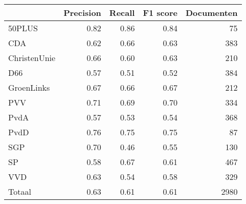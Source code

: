 \begin{tabular}{lrrrr}
\toprule
{} &  Precision &  Recall &  F1 score &  Documenten \\
\midrule
50PLUS       &       0.82 &    0.86 &      0.84 &          75 \\
CDA          &       0.62 &    0.66 &      0.63 &         383 \\
ChristenUnie &       0.66 &    0.60 &      0.63 &         210 \\
D66          &       0.57 &    0.51 &      0.52 &         384 \\
GroenLinks   &       0.67 &    0.66 &      0.67 &         212 \\
PVV          &       0.71 &    0.69 &      0.70 &         334 \\
PvdA         &       0.57 &    0.53 &      0.54 &         368 \\
PvdD         &       0.76 &    0.75 &      0.75 &          87 \\
SGP          &       0.70 &    0.46 &      0.55 &         130 \\
SP           &       0.58 &    0.67 &      0.61 &         467 \\
VVD          &       0.63 &    0.54 &      0.58 &         329 \\
Totaal       &       0.63 &    0.61 &      0.61 &        2980 \\
\bottomrule
\end{tabular}
